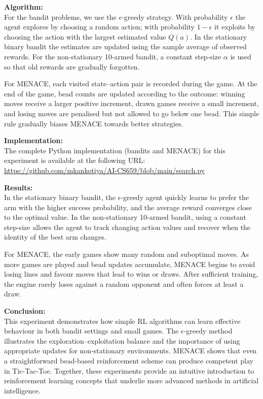 \documentclass[14pt]{extreport}
\begin{document}
\vspace{1em}

\noindent\textbf{Algorithm:}\\
For the bandit problems, we use the $\epsilon$-greedy strategy. With
probability $\epsilon$ the agent explores by choosing a random action; with
probability $1-\epsilon$ it exploits by choosing the action with the largest
estimated value $Q(a)$. In the stationary binary bandit the estimates are
updated using the sample average of observed rewards. For the non-stationary
10-armed bandit, a constant step-size $\alpha$ is used so that old rewards are
gradually forgotten.

For MENACE, each visited state--action pair is recorded during the game. At the
end of the game, bead counts are updated according to the outcome: winning
moves receive a larger positive increment, drawn games receive a small
increment, and losing moves are penalised but not allowed to go below one bead.
This simple rule gradually biases MENACE towards better strategies.

\vspace{1em}

\noindent\textbf{Implementation:}\\
The complete Python implementation (bandits and MENACE) for this experiment is
available at the following URL:\\[0.3em]
\hspace*{1em}\url{https://github.com/mkankotiya/AI-CS659/blob/main/search.py}

\vspace{1em}

\noindent\textbf{Results:}\\
In the stationary binary bandit, the $\epsilon$-greedy agent quickly learns to
prefer the arm with the higher success probability, and the average reward
converges close to the optimal value. In the non-stationary 10-armed bandit,
using a constant step-size allows the agent to track changing action values and
recover when the identity of the best arm changes.

For MENACE, the early games show many random and suboptimal moves. As more
games are played and bead updates accumulate, MENACE begins to avoid losing
lines and favour moves that lead to wins or draws. After sufficient training,
the engine rarely loses against a random opponent and often forces at least a
draw.

\vspace{1em}

\noindent\textbf{Conclusion:}\\
This experiment demonstrates how simple RL algorithms can learn effective
behaviour in both bandit settings and small games. The $\epsilon$-greedy
method illustrates the exploration--exploitation balance and the importance of
using appropriate updates for non-stationary environments. MENACE shows that
even a straightforward bead-based reinforcement scheme can produce competent
play in Tic-Tac-Toe. Together, these experiments provide an intuitive
introduction to reinforcement learning concepts that underlie more advanced
methods in artificial intelligence.
\end{document}
